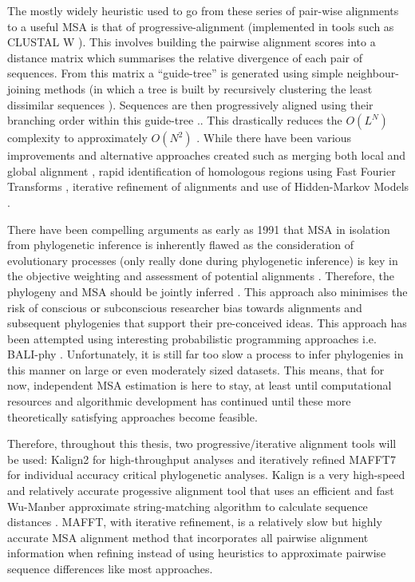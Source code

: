 The mostly widely heuristic used to go from these series of pair-wise alignments to
a useful MSA is that of progressive-alignment \citep{Feng1987} (implemented in 
tools such as CLUSTAL W \citep{Thompson1994}).  This involves building the 
pairwise alignment scores into a distance matrix which summarises 
the relative divergence of 
each pair of sequences. From this matrix a ``guide-tree'' is generated using simple
neighbour-joining methods (in which a tree is built by recursively clustering
the least dissimilar sequences \citep{Saitou1987}).  Sequences are then progressively
aligned using their branching order within this guide-tree \citep{Thompson1994}..
This drastically reduces the \(O(L^{N})\) complexity to approximately \(O(N^{2})\)
\citep{Sievers2011}. While there have been various improvements and alternative approaches
created such as merging both local and global alignment \citep{Notredame2000}, 
rapid identification of homologous regions using Fast Fourier Transforms \citep{Katoh2002},
iterative refinement of alignments \citep{Edgar2004a} and use of Hidden-Markov Models \citep{Eddy1995}.


There have been compelling arguments as early as 1991 that MSA in isolation from
phylogenetic inference is inherently flawed as the consideration of 
evolutionary processes (only really done during phylogenetic inference) 
is key in the objective weighting and assessment of potential alignments \citep{Thorne1991}.
Therefore, the phylogeny and MSA should be jointly inferred \citep{Thorne1991,Redelings2005,Bouchard-Cote2013}.
This approach also minimises the risk of conscious or subconscious researcher bias 
towards alignments and subsequent phylogenies that support their pre-conceived ideas.
This approach has been attempted using interesting probabilistic programming approaches
i.e. BALI-phy \citep{Suchard2006}. Unfortunately, it is still far too
slow a process to infer phylogenies in this manner on large or even moderately
sized datasets.  This means, that for now, independent MSA estimation is here to stay, 
at least until
computational resources and algorithmic development has continued until these more
theoretically satisfying approaches become feasible.  

Therefore, throughout this thesis, two progressive/iterative alignment tools will be used:
Kalign2 \citep{Lassmann2005,Lassmann2009} for high-throughput analyses and iteratively refined 
MAFFT7 \citep{Katoh2002,Katoh2005,Katoh2013} for individual accuracy critical phylogenetic analyses. 
Kalign is a very high-speed and relatively accurate \citep{Thompson2011} progessive alignment tool that uses
an efficient and fast Wu-Manber approximate string-matching algorithm to calculate sequence distances
\citep{Lassmann2005}.  MAFFT, with iterative refinement, is a relatively slow but highly accurate
MSA alignment method \citep{Thompson2011} that incorporates all pairwise alignment information when refining
instead of using heuristics to approximate pairwise sequence differences like most approaches.


